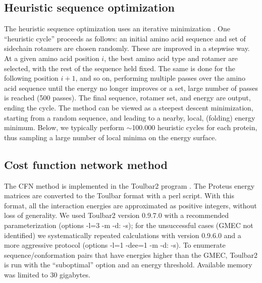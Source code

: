 \subsection{Heuristic sequence optimization}
The heuristic sequence optimization uses an iterative minimization \cite{Wernisch00,Schmidt08}. One ``heuristic cycle''
proceeds as follows: an initial amino acid sequence and set of sidechain rotamers are chosen randomly. These are
improved in a stepwise way. At a given amino acid position $i$, the best amino acid type and rotamer are selected,
with the rest of the sequence held fixed. The same is done for the following position $i+1$, and so on, performing
multiple passes over the amino acid sequence until the energy no longer improves or a set, large number of passes
is reached (500 passes). The final sequence, rotamer set, and energy are output, ending the cycle. The method can be
viewed as a steepest descent minimization, starting from a random sequence, and leading to a nearby, local, (folding)
energy minimum. Below, we typically perform ${\sim}$100.000 heuristic cycles for each protein, thus sampling a large
number of local minima on the energy surface. 

\subsection{Cost function network method}
The CFN method is implemented in the Toulbar2 program \cite{Traore13,Allouche14}. The Proteus energy matrices
are converted to the Toulbar format with a perl script. With this format, all the interaction energies are approximated
as positive integers, without loss of generality. We used Toulbar2 version 0.9.7.0 with a recommended parameterization
(options -l=3 -m -d: -s); for the unsuccessful cases (GMEC not identified) we systematically repeated calculations with
version 0.9.6.0 and a more aggressive protocol (options -l=1 -dee=1 -m -d: -s). To enumerate sequence/conformation pairs
that have energies higher than the GMEC, Toulbar2 is run with the ``suboptimal'' option and an energy threshold. Available
memory was limited to 30 gigabytes.

